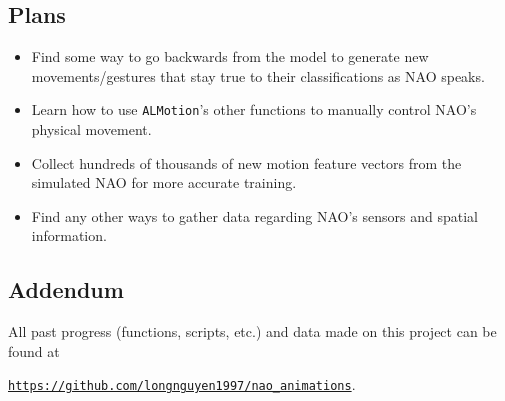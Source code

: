 \documentclass{article}
\begin{document}
  \subsection*{Plans}
  \begin{itemize}
    \item Find some way to go backwards from the model to generate new movements/gestures that stay true
          to their classifications as NAO speaks.
    \item Learn how to use \verb|ALMotion|'s other functions to manually control NAO's physical movement.
    \item Collect hundreds of thousands of new motion feature vectors from the simulated NAO for more accurate training.
    \item Find any other ways to gather data regarding NAO's sensors and spatial information.
  \end{itemize}

  \subsection*{Addendum}
  All past progress (functions, scripts, etc.) and data made on this project can be found at

  \href{https://github.com/longnguyen1997/nao_animations}{\texttt{https://github.com/longnguyen1997/nao\_animations}}.
\end{document}
